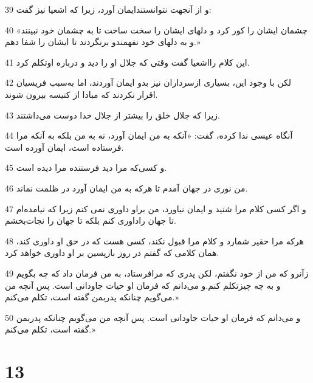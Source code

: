 \par 39 و از آنجهت نتوانستندایمان آورد، زیرا که اشعیا نیز گفت:
\par 40 «چشمان ایشان را کور کرد و دلهای ایشان را سخت ساخت تا به چشمان خود نبینند و به دلهای خود نفهمندو برنگردند تا ایشان را شفا دهم.»
\par 41 این کلام رااشعیا گفت وقتی که جلال او را دید و درباره اوتکلم کرد.
\par 42 لکن با وجود این، بسیاری ازسرداران نیز بدو ایمان آوردند، اما به‌سبب فریسیان اقرار نکردند که مبادا از کنیسه بیرون شوند.
\par 43 زیرا که جلال خلق را بیشتر از جلال خدا دوست می‌داشتند.
\par 44 آنگاه عیسی ندا کرده، گفت: «آنکه به من ایمان آورد، نه به من بلکه به آنکه مرا فرستاده است، ایمان آورده است.
\par 45 و کسی‌که مرا دید فرستنده مرا دیده است.
\par 46 من نوری در جهان آمدم تا هر‌که به من ایمان آورد در ظلمت نماند.
\par 47 و اگر کسی کلام مرا شنید و ایمان نیاورد، من براو داوری نمی کنم زیرا که نیامده‌ام تا جهان راداوری کنم بلکه تا جهان را نجات‌بخشم.
\par 48 هرکه مرا حقیر شمارد و کلام مرا قبول نکند، کسی هست که در حق او داوری کند، همان کلامی که گفتم در روز بازپسین بر او داوری خواهد کرد.
\par 49 زآنرو که من از خود نگفتم، لکن پدری که مرافرستاد، به من فرمان داد که چه بگویم و به چه چیزتکلم کنم.و می‌دانم که فرمان او حیات جاودانی است. پس آنچه من می‌گویم چنانکه پدربمن گفته است، تکلم می‌کنم.»
\par 50 و می‌دانم که فرمان او حیات جاودانی است. پس آنچه من می‌گویم چنانکه پدربمن گفته است، تکلم می‌کنم.»

\chapter{13}

